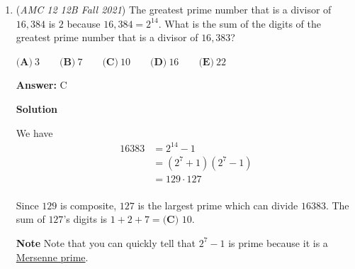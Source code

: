 \begin{enumerate}
\textbf{Solution 3 (Casework)}

We split this up into two cases:

 \textbf{Case 1: integer + integer}

 The whole numbers we have are $\frac{10}{5}$ (or $2$), $\frac{12}{3}$ (or $4$), and $\frac{14}{1}$ (or $14$). There are $\dbinom{3}{2}=3$ ways to choose different-numbered pairs and $3$ ways to choose the same-numbered pairs. So, $3+3=6$.

 \textbf{Case 2: fraction + fraction}

 The fractions we have are $\frac{5}{10}$ (or $\frac{1}{2}$), $\frac{9}{6}$ (or $\frac{3}{2}$), and $\frac{13}{2}$. Similarly, there are $\dbinom{3}{2}=3$ ways to choose different-numbered pairs and $3$ ways to choose the same-numbered pairs. So, $3+3=6$.

 Thus, $6+6=12$.

 So now you would just go ahead and innocently choose $\textbf{(D) }12$, right? No! We overcounted $8$, as $\frac{13}{2}+\frac96=\frac{12}{3}+\frac{12}{3}=8$. Therefore, the correct answer is actually $12-1=\boxed{\textbf{(C)}\  11}$.

 


	\item (\textit{AMC 12 12B Fall 2021}) The greatest prime number that is a divisor of $16{,}384$ is $2$ because $16{,}384 = 2^{14}$. What is the sum of the digits of the greatest prime number that is a divisor of $16{,}383$?


 $\textbf{(A)} \: 3\qquad\textbf{(B)} \: 7\qquad\textbf{(C)} \: 10\qquad\textbf{(D)} \: 16\qquad\textbf{(E)} \: 22$

 \textbf{Answer: }C



\textbf{Solution}

We have
 \begin{align*} 16383 & = 2^{14} - 1 \\ & = \left( 2^7 + 1 \right) \left( 2^7 - 1 \right) \\ & = 129 \cdot 127 \\ \end{align*}


 Since $129$ is composite, $127$ is the largest prime which can divide $16383$. The sum of $127$'s digits is $1+2+7=\boxed{\textbf{(C) }10}$.

 \textbf{Note} Note that you can quickly tell that $2^7 -1$ is prime because it is a \href{https://artofproblemsolving.com/wiki/index.php?title=Mersenne\_prime}{Mersenne prime}.


\end{enumerate}
